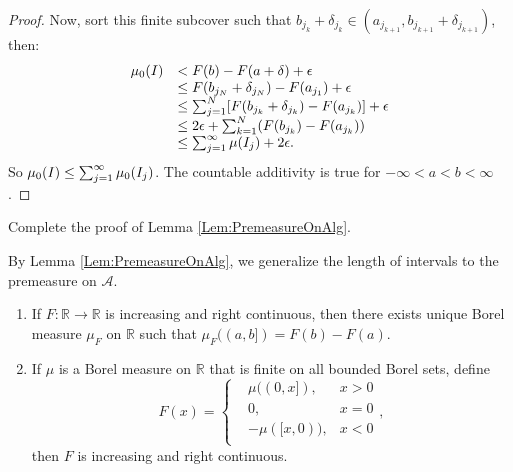\begin{proof}
    Now, sort this finite subcover such that $b_{j_k}+\delta_{j_k}
    \in(a_{j_{k+1}},b_{j_{k+1}}+\delta_{j_{k+1}})$, then:
    \begin{displaymath}
        \begin{array}{rl}
            \mu_{0}(I)&<F(b)-F(a+\delta)+\epsilon\\
            &\le F(b_{j_N}+\delta_{j_N})-F(a_{j_1})+\epsilon\\
            &\le\sum_{j=1}^{N}[F(b_{j_{k}}+\delta_{j_k})-F(a_{j_k})]+\epsilon\\
            &\le 2\epsilon+\sum_{k=1}^{N}(F(b_{j_k})-F(a_{j_k}))\\
            &\le\sum_{j=1}^{\infty}\mu(I_j)+2\epsilon.
        \end{array}
    \end{displaymath}
    So $\mu_{0}(I)\le\sum_{j=1}^{\infty}\mu_{0}(I_j)$. 
    The countable additivity is true 
    for $-\infty<a<b<\infty$. 
\end{proof}
\begin{exc}
    Complete the proof of Lemma \ref{Lem:PremeasureOnAlg}.
\end{exc}
\begin{rem}
    By Lemma \ref{Lem:PremeasureOnAlg}, we generalize 
    the length of intervals to the premeasure on $\mathcal{A}$.
\end{rem}
\begin{thm}
    \label{Thm:BorelMeasAndGenFunc}

    \begin{enumerate}
        \item If $F:\mathbb{R}\rightarrow\mathbb{R}$ is increasing and 
        right continuous, then there exists unique Borel measure 
        $\mu_{F}$ on $\mathbb{R}$ such that 
        $\mu_{F}((a,b])=F(b)-F(a)$.
        \item If $\mu$ is a Borel measure on $\mathbb{R}$ that is 
        finite on all bounded Borel sets, define 
        \begin{displaymath}
            F(x)=\left\{
                \begin{array}{rll}
                    &\mu((0,x]),&x>0\\
                    &0,&x=0\\
                    &-\mu([x,0)),&x<0\\
                \end{array}
            \right.,
        \end{displaymath}
        then $F$ is increasing and right continuous.
    \end{enumerate}
\end{thm}
